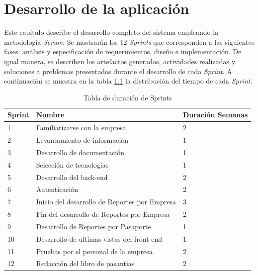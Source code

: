 \chapter{Desarrollo de la aplicación} \label{chap:Desarollo de la aplicacion}

\vspace{5 mm}

    Este capítulo describe el desarrollo completo del sistema empleando la metodología \textit{Scrum}. Se mostrarán los 12 \textit{Sprints} que corresponden a las siguientes fases: análisis y especificación de requerimientos, diseño e implementación. De igual manera, se describen los artefactos generados, actividades realizadas y soluciones a problemas presentados durante el desarrollo de cada \textit{Sprint}. A continuación se muestra en la tabla \ref{table:durSprint} la distribución del tiempo de cada \textit{Sprint}.

 \begin{table}[H]
 \centering
 \begin{tabular}{p{2cm} p{8cm} p{3cm}} 
 \hline
 Sprint & Nombre & Duración Semanas \\ [0.5ex] 
 \hline\hline
 1 & Familiarizarse con la empresa & 2 \\ 
 \hline
 2 & Levantamiento de información & 1 \\
 \hline
 3 & Desarrollo de documentación & 1 \\
 \hline
 4 & Selección de tecnologías & 1 \\
 \hline
 5 & Desarrollo del back-end & 2 \\ 
 \hline
 6 & Autenticación & 2 \\ 
 \hline
 7 & Inicio del desarrollo de Reportes por Empresa & 3 \\ 
 \hline
 8 & Fin del desarrollo de Reportes por Empresa & 2 \\ 
 \hline
 9 & Desarrollo de Reportes por Pasaporte & 1 \\ 
 \hline
 10 & Desarrollo de ultimas vistas del front-end & 1 \\ 
 \hline
 11 & Pruebas por el personal de la empresa & 2 \\ 
 \hline
 12 & Redacción del libro de pasantias & 2 \\ [1ex]
 \hline
\end{tabular}
\footnotesize \caption{Tabla de duración de Sprints}
\label{table:durSprint}
\end{table}


